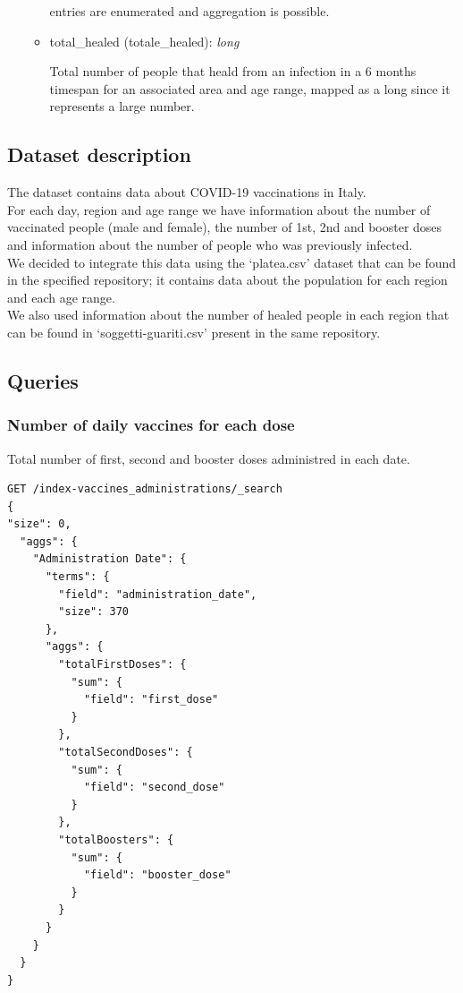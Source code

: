\documentclass[12pt, a4paper]{article}
\begin{document}
\begin{itemize}
\begin{itemize}
\begin{footnotesize}
          entries are enumerated and aggregation is possible.
        \end{footnotesize}
      \item total\_healed (totale\_healed): \emph{long} \\
        \begin{footnotesize}
          Total number of people that heald from an infection in a 6 months timespan for
          an associated area and age range, mapped as a long since it represents a large 
          number.      
        \end{footnotesize}
    \end{itemize}
\end{itemize}

\subsection{Dataset description}

The dataset contains data about COVID-19 vaccinations in Italy. \\
For each day, region and age range we have information about the number of vaccinated 
people (male and female), the number of 1st, 2nd and booster doses and information 
about the number of people who was previously infected. \\
We decided to integrate this data using the ‘platea.csv’ dataset that can be found 
in the specified repository; it contains data about the population for each region 
and each age range. \\ 
We also used information about the number of healed people in each region that can be 
found in ‘soggetti-guariti.csv’ present in the same repository.

\subsection{Queries}

\subsubsection{Number of daily vaccines for each dose}
Total number of first, second and booster doses administred in each date.
\begin{tcolorbox}[fontupper=\scriptsize]
  \begin{verbatim}
GET /index-vaccines_administrations/_search
{
"size": 0, 
  "aggs": {
    "Administration Date": {
      "terms": {
        "field": "administration_date",
        "size": 370
      },
      "aggs": {
        "totalFirstDoses": {
          "sum": {
            "field": "first_dose"
          }
        },        
        "totalSecondDoses": {
          "sum": {
            "field": "second_dose"
          }
        },        
        "totalBoosters": {
          "sum": {
            "field": "booster_dose"
          }
        }
      }
    }
  } 
}

  \end{verbatim}
\end{tcolorbox}
\end{document}
